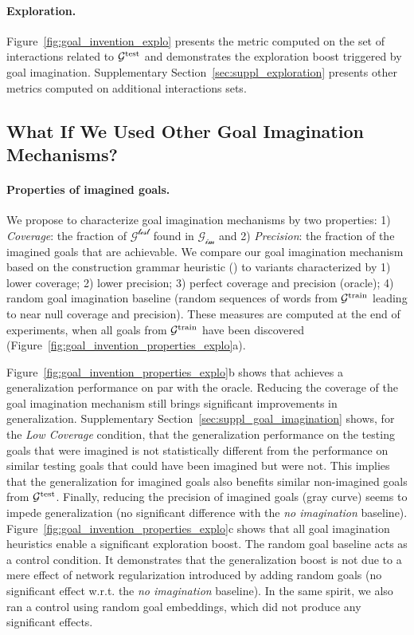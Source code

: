 \paragraph{Exploration.} 
Figure~\ref{fig:goal_invention_explo} presents the \itwoc metric computed on the set of interactions related to $\mathcal{G}^{\text{test}}$ and demonstrates the exploration boost triggered by goal imagination. Supplementary Section~\ref{sec:suppl_exploration} presents other \itwoc metrics computed on additional interactions sets.

\subsection{What If We Used Other Goal Imagination Mechanisms?}
\label{sec:res_im_properties}

\paragraph{Properties of imagined goals.} We propose to characterize goal imagination mechanisms by two properties: 1) \textit{Coverage}: the fraction of $\mathcal{G^\text{test}}$ found in $\mathcal{G_\text{im}}$ and 2) \textit{Precision}: the fraction of the imagined goals that are achievable. We compare our goal imagination mechanism based on the construction grammar heuristic (\CGH) to variants characterized by 1) lower coverage; 2) lower precision; 3) perfect coverage and precision (oracle); 4) random goal imagination baseline (random sequences of words from $\mathcal{G}^{\text{train}}$ leading to near null coverage and precision). These measures are computed at the end of experiments, when all goals from $\mathcal{G}^{\text{train}}$ have been discovered (Figure~\ref{fig:goal_invention_properties_explo}a). 




Figure~\ref{fig:goal_invention_properties_explo}b shows that \CGH achieves a generalization performance on par with the oracle. Reducing the coverage of the goal imagination mechanism still brings significant improvements in generalization. Supplementary Section~\ref{sec:suppl_goal_imagination} shows, for the \textit{Low Coverage} condition, that the generalization performance on the testing goals that were imagined is not statistically different from the performance on similar testing goals that could have been imagined but were not. This implies that the generalization for imagined goals also benefits similar non-imagined goals from $\mathcal{G}^\text{test}$. Finally, reducing the precision of imagined goals (gray curve) seems to impede generalization (no significant difference with the \textit{no imagination} baseline). Figure~\ref{fig:goal_invention_properties_explo}c shows that all goal imagination heuristics enable a significant exploration boost. The random goal baseline acts as a control condition. It demonstrates that the generalization boost is not due to a mere effect of network regularization introduced by adding random goals (no significant effect w.r.t. the \textit{no imagination} baseline). In the same spirit, we also ran a control using random goal embeddings, which did not produce any significant effects.

